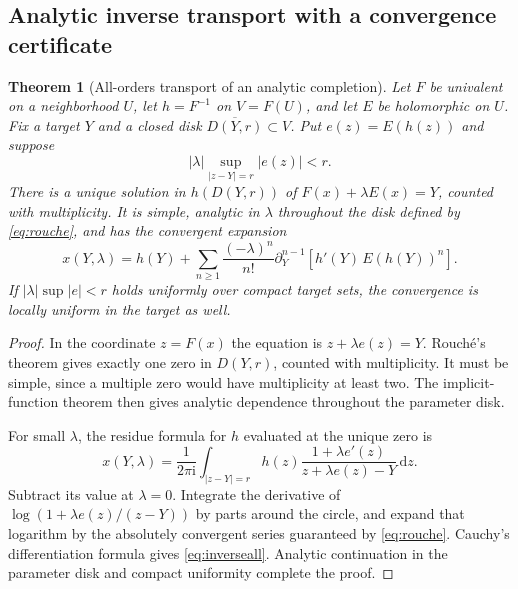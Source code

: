 \documentclass[11pt,a4paper]{article}
\numberwithin{equation}{section}
\newtheorem{theorem}{Theorem}[section]
\theoremstyle{definition}
\theoremstyle{remark}
\newcommand{\ii}{\mathrm i}
\newcommand{\dd}{\,\mathrm d}
\begin{document}
\subsection{Analytic inverse transport with a convergence certificate}
\begin{theorem}[All-orders transport of an analytic completion]
\label{thm:inverse}
Let $F$ be univalent on a neighborhood $U$, let $h=F^{-1}$ on $V=F(U)$,
and let $E$ be holomorphic on $U$. Fix a target $Y$ and a closed disk
$\overline{D(Y,r)}\subset V$. Put $e(z)=E(h(z))$ and suppose
\begin{equation}
 |\lambda|\sup_{|z-Y|=r}|e(z)|<r.
 \label{eq:rouche}
\end{equation}
There is a unique solution in $h(D(Y,r))$ of
$F(x)+\lambda E(x)=Y$, counted with multiplicity. It is simple,
analytic in $\lambda$ throughout the disk defined by
\eqref{eq:rouche}, and has the convergent expansion
\begin{equation}
 x(Y,\lambda)=h(Y)+\sum_{n\geq1}\frac{(-\lambda)^n}{n!}
 \partial_Y^{n-1}\!\left[h'(Y)\,E(h(Y))^n\right].
 \label{eq:inverseall}
\end{equation}
If $|\lambda|\sup|e|<r$ holds uniformly over compact target sets, the
convergence is locally uniform in the target as well.
\end{theorem}
\begin{proof}
In the coordinate $z=F(x)$ the equation is $z+\lambda e(z)=Y$.
Rouch\'e's theorem gives exactly one zero in $D(Y,r)$, counted with
multiplicity. It must be simple, since a multiple zero would have
multiplicity at least two. The implicit-function theorem then gives
analytic dependence throughout the parameter disk.

For small $\lambda$, the residue formula for $h$ evaluated at the
unique zero is
\[
 x(Y,\lambda)=\frac1{2\pi\ii}\int_{|z-Y|=r}
 h(z)\frac{1+\lambda e'(z)}{z+\lambda e(z)-Y}\dd z.
\]
Subtract its value at $\lambda=0$. Integrate the derivative of
$\log(1+\lambda e(z)/(z-Y))$ by parts around the circle, and expand
that logarithm by the absolutely convergent series guaranteed by
\eqref{eq:rouche}. Cauchy's differentiation formula gives
\eqref{eq:inverseall}. Analytic continuation in the parameter disk
and compact uniformity complete the proof.
\end{proof}
\end{document}
